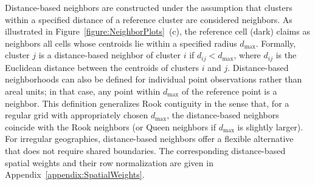 \documentclass{article}[11pt]
\begin{document}
Distance-based neighbors\cite{fotheringham_sage_2009} are constructed under the assumption that clusters within a specified distance of a reference cluster are considered neighbors. As illustrated in Figure~\ref{figure:NeighborPlots}~(c), the reference cell (dark) claims as neighbors all cells whose centroids lie within a specified radius $d_{\max}$. Formally, cluster $j$ is a distance-based neighbor of cluster $i$ if $d_{ij} < d_{\max}$, where $d_{ij}$ is the Euclidean distance between the centroids of clusters $i$ and $j$. Distance-based neighborhoods can also be defined for individual point observations rather than areal units; in that case, any point within $d_{\max}$ of the reference point is a neighbor. This definition generalizes Rook contiguity in the sense that, for a regular grid with appropriately chosen $d_{\max}$, the distance-based neighbors coincide with the Rook neighbors (or Queen neighbors if $d_{\max}$ is slightly larger). For irregular geographies, distance-based neighbors offer a flexible alternative that does not require shared boundaries. The corresponding distance-based spatial weights and their row normalization are given in Appendix~\ref{appendix:SpatialWeights}.
\end{document}
